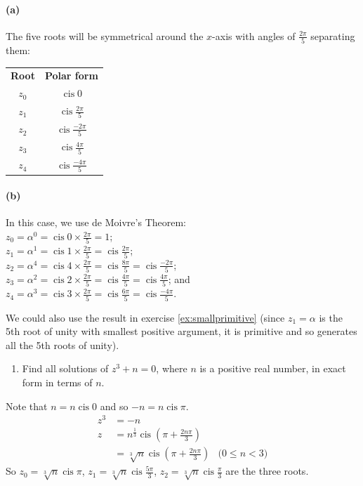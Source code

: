 \documentclass[a4paper,10pt]{article}
\DeclareMathOperator{\cis}{cis}
\newcommand{\answer}{\bfseries\color{Emerald}\refstepcounter{enumi}\item[\theenumi.]}
\begin{document}
\paragraph{(a)}
The five roots will be symmetrical around the $ x$-axis with angles of $ \frac{2\pi}{5} $ separating them:
\begin{center}
\begin{tabular} {c | c}
  \textbf{Root} & \textbf{Polar form}\\
  $ z_0 $ & $ \cis 0 $               \\
  $ z_1 $ & $ \cis \frac{2\pi}{5} $  \\
  $ z_2 $ & $ \cis \frac{-2\pi}{5} $ \\
  $ z_3 $ & $ \cis \frac{4\pi}{5} $  \\
  $ z_4 $ & $ \cis \frac{-4\pi}{5} $
\end{tabular}
\end{center}

\paragraph{(b)}
In this case, we use de Moivre's Theorem:\\
$ z_0 = \alpha^0 = \cis 0\times\frac{2\pi}{5} = 1 $;\\
$ z_1 = \alpha^1 = \cis 1\times\frac{2\pi}{5} = \cis \frac{2\pi}{5} $;\\
$ z_2 = \alpha^4 = \cis 4\times\frac{2\pi}{5} = \cis \frac{8\pi}{5} = \cis \frac{-2\pi}{5} $;\\
$ z_3 = \alpha^2 = \cis 2\times\frac{2\pi}{5} = \cis \frac{4\pi}{5} = \cis \frac{4\pi}{5} $; and\\
$ z_4 = \alpha^3 = \cis 3\times\frac{2\pi}{5} = \cis \frac{6\pi}{5} = \cis \frac{-4\pi}{5} $.

We could also use the result in exercise \ref{ex:smallprimitive} (since $ z_1 = \alpha $ is the 5th root of unity with smallest positive
argument, it is primitive and so generates all the 5th roots of unity).

\filbreak\begin{enumerate}[resume]
  \answer Find all solutions of $ z^3 + n = 0 $, where $ n $ is a positive real number,
        in exact form in terms of $ n $.
\end{enumerate}
Note that $ n = n \cis 0 $ and so $ -n = n \cis \pi $.
\begin{align*}
  z^3 &= -n\\
  z   &= n^{\frac{1}{3}} \cis \left(\pi + \frac{2n\pi}{3}\right)\\
      &= \sqrt[3]{n} \cis \left(\pi + \frac{2n\pi}{3} \right)    &\text{($0 \leq n < 3$)}
\end{align*}
So $ z_0 = \sqrt[3]{n} \cis \pi $, $ z_1 = \sqrt[3]{n} \cis \frac{5\pi}{3} $, $ z_2 = \sqrt[3]{n} \cis \frac{\pi}{3} $ are
the three roots.
\end{document}
